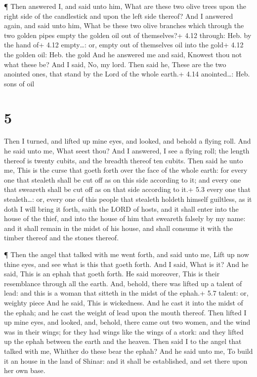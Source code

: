  ¶ Then answered I, and said unto him, What are these two
olive trees upon the right side of the candlestick and upon the left
side thereof?  And I answered again, and said unto him,
What be these two olive branches which through the two golden pipes
empty the golden oil out of themselves?+ 4.12 through: Heb. by the hand
of+ 4.12 empty\ldots: or, empty out of themselves oil into the gold+
4.12 the golden oil: Heb. the gold  And he answered me and
said, Knowest thou not what these be? And I said, No, my lord.
 Then said he, These are the two anointed ones, that stand
by the Lord of the whole earth.+ 4.14 anointed\ldots: Heb. sons of oil

\hypertarget{section-4}{%
\section{5}\label{section-4}}

 Then I turned, and lifted up mine eyes, and looked, and
behold a flying roll.  And he said unto me, What seest thou?
And I answered, I see a flying roll; the length thereof is twenty
cubits, and the breadth thereof ten cubits.  Then said he
unto me, This is the curse that goeth forth over the face of the whole
earth: for every one that stealeth shall be cut off as on this side
according to it; and every one that sweareth shall be cut off as on that
side according to it.+ 5.3 every one that stealeth\ldots: or, every one
of this people that stealeth holdeth himself guiltless, as it doth
 I will bring it forth, saith the LORD of hosts, and it
shall enter into the house of the thief, and into the house of him that
sweareth falsely by my name: and it shall remain in the midst of his
house, and shall consume it with the timber thereof and the stones
thereof.

 ¶ Then the angel that talked with me went forth, and said
unto me, Lift up now thine eyes, and see what is this that goeth forth.
 And I said, What is it? And he said, This is an ephah that
goeth forth. He said moreover, This is their resemblance through all the
earth.  And, behold, there was lifted up a talent of lead:
and this is a woman that sitteth in the midst of the ephah.+ 5.7 talent:
or, weighty piece  And he said, This is wickedness. And he
cast it into the midst of the ephah; and he cast the weight of lead upon
the mouth thereof.  Then lifted I up mine eyes, and looked,
and, behold, there came out two women, and the wind was in their wings;
for they had wings like the wings of a stork: and they lifted up the
ephah between the earth and the heaven.  Then said I to the
angel that talked with me, Whither do these bear the ephah?
 And he said unto me, To build it an house in the land of
Shinar: and it shall be established, and set there upon her own base.

